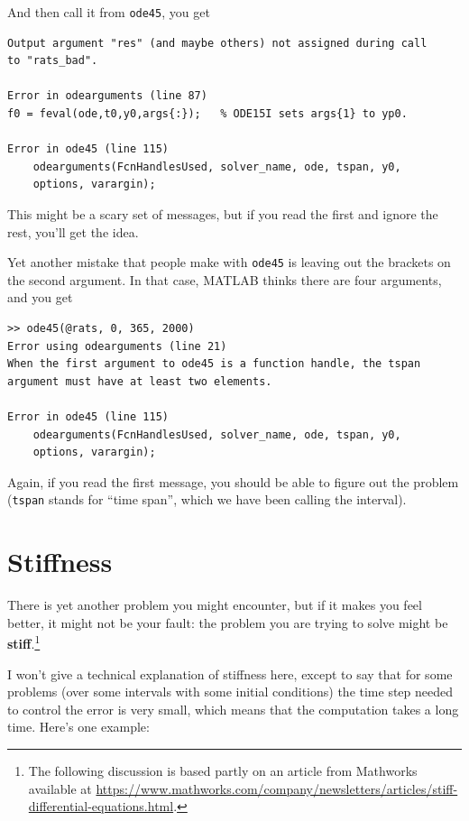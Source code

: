 \documentclass[
]{book}
\begin{document}
And then call it from {\tt ode45}, you get

\begin{verbatim}
Output argument "res" (and maybe others) not assigned during call
to "rats_bad".

Error in odearguments (line 87)
f0 = feval(ode,t0,y0,args{:});   % ODE15I sets args{1} to yp0.

Error in ode45 (line 115)
    odearguments(FcnHandlesUsed, solver_name, ode, tspan, y0,
    options, varargin);
\end{verbatim}

This might be a scary set of messages, but if you read the first and ignore the rest, you’ll get the idea.

Yet another mistake that people make with {\tt ode45} is leaving
out the brackets on the second argument.  In that case, MATLAB
thinks there are four arguments, and you get

\begin{verbatim}
>> ode45(@rats, 0, 365, 2000)
Error using odearguments (line 21)
When the first argument to ode45 is a function handle, the tspan
argument must have at least two elements.

Error in ode45 (line 115)
    odearguments(FcnHandlesUsed, solver_name, ode, tspan, y0,
    options, varargin);
\end{verbatim}

Again, if you read the first message, you should be able to figure
out the problem ({\tt tspan} stands for ``time span'', which we
have been calling the interval).


\section{Stiffness}

There is yet another problem you might encounter, but if it makes you
feel better, it might not be your fault: the problem you are trying to
solve might be {\bf stiff}.\footnote{The following discussion is based
partly on an article from Mathworks available at
\url{https://www.mathworks.com/company/newsletters/articles/stiff-differential-equations.html}.}

I won't give a technical explanation of stiffness here, except
to say that for some problems (over some intervals with some initial
conditions) the time step needed to control the error is very small,
which means that the computation takes a long time.  Here's one
example:
\end{document}
